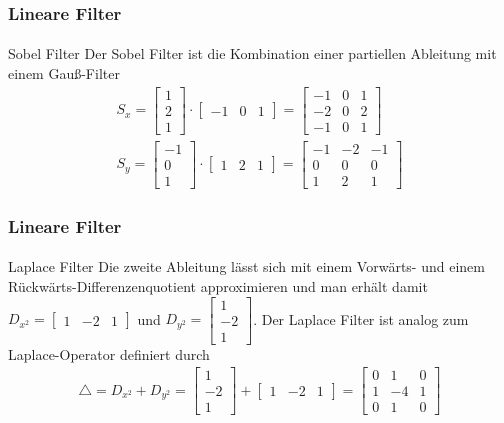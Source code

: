 \documentclass{beamer}
\begin{document}
\begin{frame}
    \frametitle{Lineare Filter}
\framesubtitle{}

\begin{block}{Sobel Filter}
Der Sobel Filter ist die Kombination einer partiellen Ableitung mit einem Gauß-Filter
\begin{align*}
S_x  = \begin{bmatrix}  1 \\ 2 \\ 1\end{bmatrix} \cdot  \begin{bmatrix}  -1 & 0 & 1\end{bmatrix} = \begin{bmatrix}  -1 & 0 & 1 \\ -2 & 0 & 2 \\ -1 & 0 & 1 \end{bmatrix} \\
S_y  = \begin{bmatrix}  -1 \\ 0 \\ 1\end{bmatrix} \cdot  \begin{bmatrix}  1 & 2 & 1\end{bmatrix} = \begin{bmatrix}  -1 & -2 & -1 \\ 0 & 0 & 0 \\ 1 & 2 & 1 \end{bmatrix} 
\end{align*}

\end{block}
 \end{frame}


\begin{frame}
    \frametitle{Lineare Filter}
\framesubtitle{}

\begin{block}{Laplace Filter}
Die zweite Ableitung lässt sich mit einem Vorwärts- und einem Rückwärts-Differenzenquotient  approximieren und man erhält damit $D_{x^2} =  \begin{bmatrix}  1 & -2 & 1\end{bmatrix} $ und 
 $D_{y^2} =  \begin{bmatrix}  1 \\ -2 \\ 1\end{bmatrix}$. Der Laplace Filter ist analog zum Laplace-Operator definiert durch 
\begin{align*}
\triangle  = D_{x^2}  + D_{y^2}  = \begin{bmatrix}  1 \\ -2 \\ 1\end{bmatrix}  +  \begin{bmatrix}  1 & -2 & 1\end{bmatrix} = \begin{bmatrix}  0 & 1 & 0 \\ 1 & -4 & 1 \\  0 & 1 & 0 \end{bmatrix} 
\end{align*}

\end{block}
 \end{frame}
\end{document}
